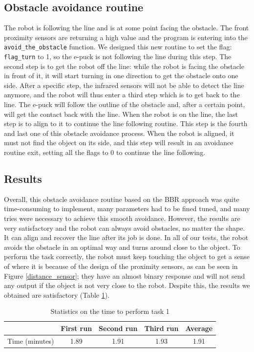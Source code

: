 \documentclass[lettersize,journal]{IEEEtran}
\begin{document}
\subsection{Obstacle avoidance routine}
The robot is following the line and is at some point facing the obstacle. The front proximity sensors are returning a high value and the program is entering into the  \texttt{avoid\_the\_obstacle} function. We designed this new routine to set the flag:  \texttt{flag\_turn}  to 1, so the e-puck is not following the line during this step. 
The second step is to get the robot off the line: while the robot is facing the obstacle in front of it, it will start turning in one direction to get the obstacle onto one side. After a specific step, the infrared sensors will not be able to detect the line anymore, and the robot will thus enter a third step which is to get back to the line. 
The e-puck will follow the outline of the obstacle and, after a certain point, will get the contact back with the line. When the robot is on the line, the last step is to align to it to continue the line following routine. This step is the fourth and last one of this obstacle avoidance process. When the robot is aligned, it must not find the object on its side, and this step will result in an avoidance routine exit, setting all the flags to 0 to continue the line following.
\subsection{Results}
Overall, this obstacle avoidance routine based on the BBR approach was quite time-consuming to implement, many parameters had to be fined tuned, and many tries were necessary to achieve this smooth avoidance. However, the results are very satisfactory and the robot can always avoid obstacles, no matter the shape. It can align and recover the line after its job is done. In all of our tests, the robot avoids the obstacle in an optimal way and turns around close to the object. To perform the task correctly, the robot must keep touching the object to get a sense of where it is because of the design of the proximity sensors, as can be seen in Figure \ref{distance_sensor}; they have an almost binary response and will not send any output if the object is not very close to the robot. Despite this, the results we obtained are satisfactory (Table \ref{task1}).

\begin{table}[H]
\begin{center}
\caption{Statistics on the time to perform task 1}
\label{task1}
\begin{tabular}{| c | c | c | c | c |}
\hline
   & First run & Second run & Third run & Average\\
\hline
Time (minutes) & 1.89 & 1.91 & 1.93 & 1.91\\
\hline
\end{tabular}
\end{center}
\end{table}
\end{document}
